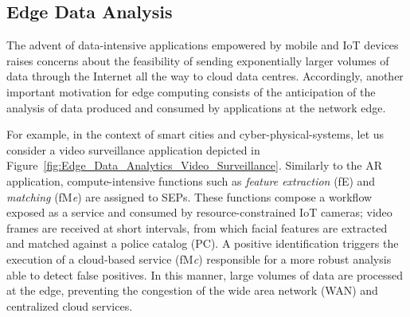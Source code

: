 \subsection{Edge Data Analysis}\label{sec:SEP_EDA}

The advent of data-intensive applications empowered by mobile and IoT devices raises concerns about the feasibility of sending exponentially larger volumes of data through the Internet all the way to cloud data centres. Accordingly, another important motivation for edge computing consists of the anticipation of the analysis of data produced and consumed by applications at the network edge. 



For example, in the context of smart cities and cyber-physical-systems, let us consider a video surveillance application 
depicted in Figure~\ref{fig:Edge_Data_Analytics_Video_Surveillance}. Similarly to the AR application, compute-intensive functions such as \textit{feature extraction} (fE) and \textit{matching} (fM\textit{e}) are assigned to  SEPs.
These functions compose a workflow exposed as a service and consumed by resource-constrained IoT cameras; video frames are received at short intervals, from which facial features are extracted and matched against a police catalog (PC). A positive identification triggers the execution of a cloud-based service (fM\textit{c}) responsible for a more robust analysis able to detect false positives. In this manner, large volumes of data are processed at the edge, preventing the congestion of the wide area network (WAN) and centralized cloud services.



